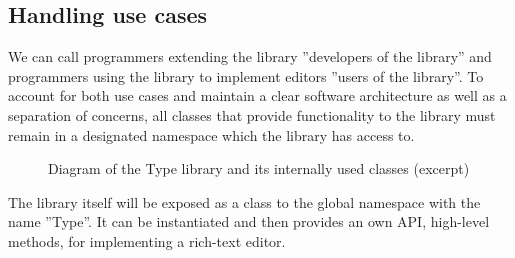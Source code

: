 


\subsection{Handling use cases}
\label{subsec:api_design_handling_use_cases}

We can call programmers extending the library ''developers of the library'' and programmers using the library to implement editors ''users of the library''. To account for both use cases and maintain a clear software architecture as well as a separation of concerns, all classes that provide functionality to the library must remain in a designated namespace which the library has access to. 

\begin{figure}[!htb]
\centering
{}
\caption{Diagram of the Type library and its internally used classes (excerpt)}
\label{fig:type_uml_excerpt}
\end{figure}

The library itself will be exposed as a class to the global namespace with the name ''Type''. It can be instantiated and then provides an own API, high-level methods, for implementing a rich-text editor.

